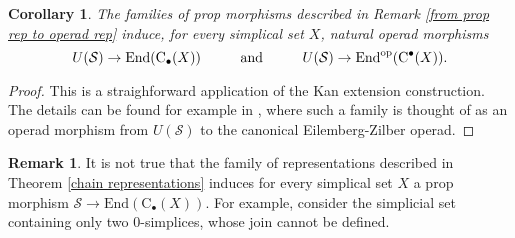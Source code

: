 \documentclass{amsart}
\renewcommand{\S}{\mathcal{S}}
\newcommand{\chains}{\mathrm{C}_\bullet}
\newcommand{\cochains}{\mathrm{C}^\bullet}
\newcommand{\End}{\mathrm{End}}
\newtheorem{corollary}[theorem]{Corollary}
\theoremstyle{definition}
\newtheorem{remark}[theorem]{Remark}
\begin{document}
	
	\begin{corollary} \label{simplicial set representations}
		The families of prop morphisms described in Remark \ref{from prop rep to operad rep} induce, for every simplical set $X$, natural operad morphisms 
		$$U(\S)\to \End(\chains(X))\hspace*{1cm}\text{and}\hspace*{1cm}U(\S)\to \End^{\mathrm{op}}(\cochains(X)).$$
	\end{corollary}
	\begin{proof}
		This is a straighforward application of the Kan extension construction. The details can be found for example in \cite{may2003operads}, where such a family is thought of as an operad morphism from $U(\S)$ to the canonical Eilemberg-Zilber operad.  
	\end{proof}
	\begin{remark}
		It is not true that the family of representations described in Theorem \ref{chain representations} induces for every simplical set $X$ a prop morphism $\S\to\End(\chains(X))$. For example, consider the simplicial set containing only two $0$-simplices, whose join cannot be defined. 
	\end{remark}
	
\end{document}
